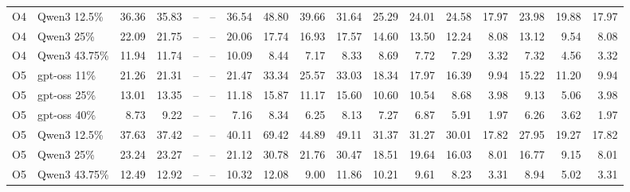 \begin{table}[t]
\begin{tabular}{@{}llrr|rrrrrr|rrr|r|rrr@{}}
O4 & Qwen3 12.5\% & 36.36 & 35.83 & -- & -- & 36.54 & 48.80 & 39.66 & 31.64 & 25.29 & 24.01 & 24.58 & 17.97 & 23.98 & 19.88 & 17.97 \\
O4 & Qwen3 25\% & 22.09 & 21.75 & -- & -- & 20.06 & 17.74 & 16.93 & 17.57 & 14.60 & 13.50 & 12.24 & 8.08 & 13.12 & 9.54 & 8.08 \\
O4 & Qwen3 43.75\% & 11.94 & 11.74 & -- & -- & 10.09 & 8.44 & 7.17 & 8.33 & 8.69 & 7.72 & 7.29 & 3.32 & 7.32 & 4.56 & 3.32 \\
O5 & gpt-oss 11\% & 21.26 & 21.31 & -- & -- & 21.47 & 33.34 & 25.57 & 33.03 & 18.34 & 17.97 & 16.39 & 9.94 & 15.22 & 11.20 & 9.94 \\
O5 & gpt-oss 25\% & 13.01 & 13.35 & -- & -- & 11.18 & 15.87 & 11.17 & 15.60 & 10.60 & 10.54 & 8.68 & 3.98 & 9.13 & 5.06 & 3.98 \\
O5 & gpt-oss 40\% & 8.73 & 9.22 & -- & -- & 7.16 & 8.34 & 6.25 & 8.13 & 7.27 & 6.87 & 5.91 & 1.97 & 6.26 & 3.62 & 1.97 \\
O5 & Qwen3 12.5\% & 37.63 & 37.42 & -- & -- & 40.11 & 69.42 & 44.89 & 49.11 & 31.37 & 31.27 & 30.01 & 17.82 & 27.95 & 19.27 & 17.82 \\
O5 & Qwen3 25\% & 23.24 & 23.27 & -- & -- & 21.12 & 30.78 & 21.76 & 30.47 & 18.51 & 19.64 & 16.03 & 8.01 & 16.77 & 9.15 & 8.01 \\
O5 & Qwen3 43.75\% & 12.49 & 12.92 & -- & -- & 10.32 & 12.08 & 9.00 & 11.86 & 10.21 & 9.61 & 8.23 & 3.31 & 8.94 & 5.02 & 3.31 \\
\bottomrule\end{tabular}\end{table}
